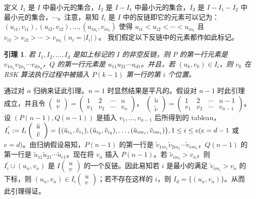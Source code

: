 \documentclass[a4paper,11pt]{article}
\newtheorem{lem}[thm]{引理}
\begin{document}
定义 $I_1$ 是 $I$ 中最小元的集合，$I_2$ 是 $I-I_1$
中最小元的集合，$I_3$ 是 $I-I_1-I_2$
中最小元的集合，$\cdots$。注意，易知 $I_i$ 是 $I$
中的反链即它的元素可以记为：$(u_{i1}, v_{i1}), (u_{i2}, v_{i2}),
\ldots, (u_{in_i}, v_{in_i})$ 使得 $u_{i1}<u_{i2}<\cdots<u_{in_i}$
且
$v_{i1}>v_{i2}>\cdots>v_{in_i}(n_i=|I_i|)$。
我们假定以下反链中的元素都作如此标记。


\begin{lem}\label{ya}  若 $I_1, I_2, \ldots, I_d$ 是如上标记的 $I$ 的非空反链，则 $P$ 的第一行元素是 $v_{1n_1}v_{2n_2}\cdots
v_{dn_d}$，$Q$ 的第一行元素是 $u_{11}u_{21}\cdots u_{d1}$。并且，若
$(u_k, v_k)\in I_i$，则 $v_k$ 在 RSK 算法执行过程中被插入 $P(k-1)$
第一行的第 $i$ 个位置。
\end{lem}


 通过对 $n$ 归纳来证此引理。$n=1$
时显然结果是平凡的。假设对 $n-1$ 时此引理成立，并且令
$\left(\begin{array}{c}
u\\v\end{array}\right)=\left(\begin{array}{cccc}
1&2&\cdots&n\\v_1&v_2&\cdots&v_n\end{array}\right)$，
$\left(\begin{array}{c}
\tilde{u}\\\tilde{v}\end{array}\right)=\left(\begin{array}{cccc}
1&2&\cdots&n-1\\v_1&v_2&\cdots&v_{n-1}\end{array}\right)$。 设
$(P(n-1), Q(n-1))$ 是插入 $v_1, \ldots, v_{n-1}$ 后所得到的
tableau，$I_i^{'} :=I_i\left(\begin{array}{c}
\tilde{u}\\\tilde{v}\end{array}\right)=\{(\tilde{u}_{i_1},
\tilde{v}_{i_1}),  (\tilde{u}_{i_2}, \tilde{v}_{i_2}), \ldots,
(\tilde{u}_{im_i}, \tilde{v}_{im_i})\},\\ 1\leq i\leq e(e=d-1$ 或
$e=d)$。由归纳假设易知，$P(n-1)$ 的第一行是
$\tilde{v}_{1m_1}\tilde{v}_{2m_2}\cdots\tilde{v}_{em_e}$，$Q(n-1)$
的第一行是
$\tilde{u}_{11}\tilde{u}_{21}\cdots\tilde{u}_{e1}$。现在将 $v_n$
插入 $P(n-1)$。若 $\tilde{v}_{im_i}>v_n$，则 $I_i^{'}\cup (u_n,
v_n)$ 是 $I\left(\begin{array}{c} u\\v\end{array}\right)$
的一个反链。因此易知若 $i$ 是最小的满足 $\tilde{v}_{im_i}>v_n$
的下标，则 $(u_n, v_n)\in I_i\left(\begin{array}{c}
u\\v\end{array}\right)$；若不存在这样的 $i$，则 $I_d=\{(u_n,
v_n)\}$。从而此引理得证。
\end{document}
